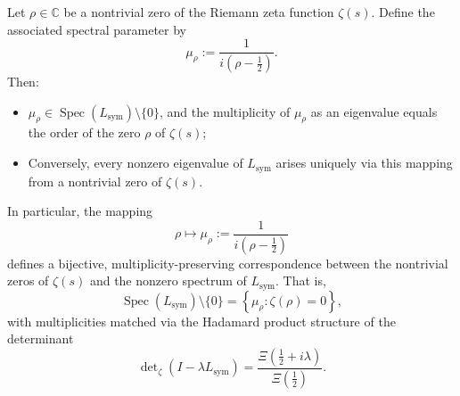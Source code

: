 \begin{lemma}
\label{lem:spectral_zero_encoding}
Let \( \rho \in \mathbb{C} \) be a nontrivial zero of the Riemann zeta function \( \zeta(s) \). Define the associated spectral parameter by
\[
\mu_\rho := \frac{1}{i(\rho - \tfrac{1}{2})}.
\]
Then:
\begin{itemize}
  \item \( \mu_\rho \in \operatorname{Spec}(L_{\mathrm{sym}}) \setminus \{0\} \), and the multiplicity of \( \mu_\rho \) as an eigenvalue equals the order of the zero \( \rho \) of \( \zeta(s) \);
  \item Conversely, every nonzero eigenvalue of \( L_{\mathrm{sym}} \) arises uniquely via this mapping from a nontrivial zero of \( \zeta(s) \).
\end{itemize}

\medskip
\noindent
In particular, the mapping
\[
\rho \mapsto \mu_\rho := \frac{1}{i(\rho - \tfrac{1}{2})}
\]
defines a bijective, multiplicity-preserving correspondence between the nontrivial zeros of \( \zeta(s) \) and the nonzero spectrum of \( L_{\mathrm{sym}} \). That is,
\[
\operatorname{Spec}(L_{\mathrm{sym}}) \setminus \{0\} = \left\{ \mu_\rho : \zeta(\rho) = 0 \right\},
\]
with multiplicities matched via the Hadamard product structure of the determinant
\[
\det\nolimits_\zeta(I - \lambda L_{\mathrm{sym}}) = \frac{\Xi\left(\tfrac{1}{2} + i\lambda\right)}{\Xi\left(\tfrac{1}{2}\right)}.
\]
\end{lemma}
